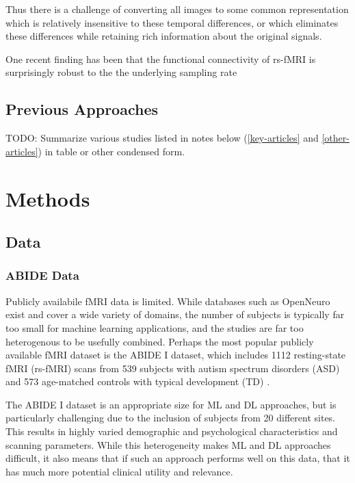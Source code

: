 \documentclass[10pt]{article}
\begin{document}
Thus there is a challenge of converting all images to some common representation which is relatively
insensitive to these temporal differences, or which eliminates these differences while retaining
rich information about the original signals.

One recent finding has been that the functional connectivity of rs-fMRI is surprisingly robust to the
the underlying sampling rate \citep{huotariSamplingRateEffects2019,shakilEvaluationSlidingWindow2016}

\subsection{Previous Approaches}

TODO: Summarize various studies listed in notes below (\ref{key-articles} and \ref{other-articles})
in table or other condensed form.



\section{Methods} \label{sec:methods}

\subsection{Data}

\subsubsection{ABIDE Data}

Publicly availabile fMRI data is limited. While databases such as OpenNeuro
\citep{markiewiczOpenNeuroOpenResource2021} exist and cover a wide variety of domains, the number
of subjects is typically far too small for machine learning applications, and the studies are far
too heterogenous to be usefully combined. Perhaps the most popular publicly available fMRI dataset
is the ABIDE I dataset, which includes 1112 resting-state fMRI (rs-fMRI) scans from 539 subjects
with autism spectrum disorders (ASD) and 573 age-matched controls with typical development (TD)
\citep{dimartinoAutismBrainImaging2014}.

The ABIDE I dataset is an appropriate size for ML and DL approaches, but is particularly challenging
due to the inclusion of subjects from 20 different sites. This results in highly varied demographic
and psychological characteristics and scanning parameters. While this heterogeneity makes ML and DL
approaches difficult, it also means that if such an approach performs well on this data, that it has
much more potential clinical utility and relevance.
\end{document}
